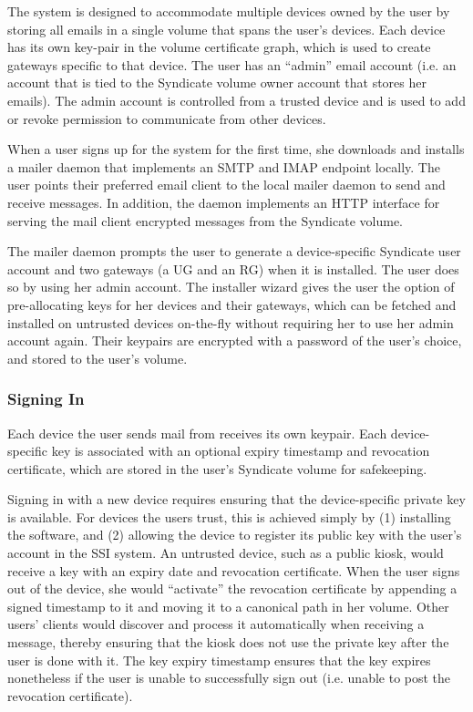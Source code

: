 The system is designed to accommodate multiple devices owned by the user by
storing all emails in a single volume that spans the user's devices.  Each
device has its own key-pair in the volume certificate graph, which is used to create
gateways specific to that device.  The user has an ``admin'' email account (i.e. an
account that is tied to the Syndicate volume owner account that stores her
emails).  The admin account is controlled
from a trusted device and is used to add or revoke permission to communicate from
other devices.

When a user signs up for the system for the first time, she downloads and
installs a mailer daemon
that implements an SMTP and IMAP endpoint locally.  The user points their preferred email
client to the local mailer daemon to send and receive messages.  In addition,
the daemon implements an HTTP interface for serving the mail client encrypted
messages from the Syndicate volume.

The mailer daemon prompts the user to generate a device-specific
Syndicate user account and two gateways (a UG and an RG)
when it is installed.  The user does so by using her
admin account.  The installer wizard gives the user the option of pre-allocating
keys for her devices and their gateways, which can be fetched and installed on untrusted devices
on-the-fly without requiring her to use her admin account again.  Their
keypairs are encrypted with a password of the user's choice, and stored to the user's
volume.

\subsubsection{Signing In}

Each device the user sends mail from receives its own keypair.  Each
device-specific key is associated with an optional expiry timestamp and
revocation certificate, which are stored in the user's Syndicate volume for
safekeeping.

Signing in with a new device requires ensuring that the device-specific private key is
available.  For devices the users trust, this is achieved simply by (1)
installing the software, and (2) allowing the device to register its public key
with the user's account in the SSI system.  An untrusted device, such as a
public kiosk, would receive a key with an expiry date and revocation certificate.
When the user signs out of the device, she would ``activate'' the revocation
certificate by appending a signed timestamp to it and 
moving it to a canonical path in her volume.  Other users'
clients would discover and process it automatically when receiving a message,
thereby ensuring that the kiosk does not use the private key after the user is
done with it.  The key expiry timestamp
ensures that the key expires nonetheless if the user is unable to successfully
sign out (i.e. unable to post the revocation certificate).

